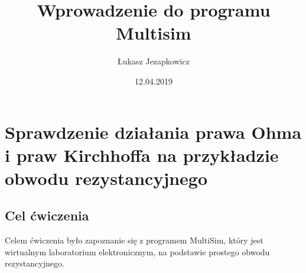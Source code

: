 \documentclass[11pt]{article}
\author{Łukasz Jezapkowicz}
\title{Wprowadzenie do programu Multisim}
\date{12.04.2019}
\begin{document}
\maketitle
\tableofcontents \newpage
\section{Sprawdzenie działania prawa Ohma i praw Kirchhoffa na przykładzie obwodu rezystancyjnego}
\subsection{Cel ćwiczenia}
Celem ćwiczenia było zapoznanie się z programem MultiSim, który jest wirtualnym laboratorium elektronicznym, na podstawie prostego obwodu rezystancyjnego. \newline \newline
\end{document}
